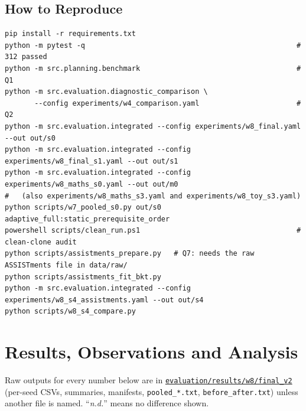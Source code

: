 \documentclass[english]{sintr}
\newcommand{\repourl}{https://github.com/Bhuvan-56/adaptive-learning-path-planner-DAT}
\newcommand{\sha}{cs5903-final-2026}
\DeclareRobustCommand{\rd}[1]{\href{\repourl/tree/\sha/#1}{\nolinkurl{#1}}}
\newcommand{\nd}{\textit{n.d.}}
\begin{document}
\subsection{How to Reproduce}
{\footnotesize
\begin{verbatim}
pip install -r requirements.txt
python -m pytest -q                                                  # 312 passed
python -m src.planning.benchmark                                     # Q1
python -m src.evaluation.diagnostic_comparison \
       --config experiments/w4_comparison.yaml                       # Q2
python -m src.evaluation.integrated --config experiments/w8_final.yaml    --out out/s0
python -m src.evaluation.integrated --config experiments/w8_final_s1.yaml --out out/s1
python -m src.evaluation.integrated --config experiments/w8_maths_s0.yaml --out out/m0
#   (also experiments/w8_maths_s3.yaml and experiments/w8_toy_s3.yaml)
python scripts/w7_pooled_s0.py out/s0 adaptive_full:static_prerequisite_order
powershell scripts/clean_run.ps1                                     # clean-clone audit
python scripts/assistments_prepare.py   # Q7: needs the raw ASSISTments file in data/raw/
python scripts/assistments_fit_bkt.py
python -m src.evaluation.integrated --config experiments/w8_s4_assistments.yaml --out out/s4
python scripts/w8_s4_compare.py
\end{verbatim}
}
\section{Results, Observations and Analysis}
Raw outputs for every number below are in \rd{evaluation/results/w8/final_v2} (per-seed CSVs, summaries, manifests, \texttt{pooled\_*.txt}, \texttt{before\_after.txt}) unless another file is named. ``\nd'' means no difference shown.
\end{document}
